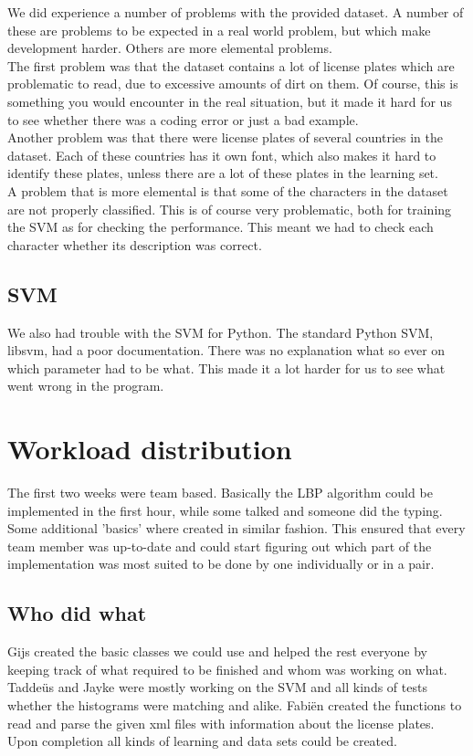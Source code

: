 \documentclass[a4paper]{article}
\begin{document}
We did experience a number of problems with the provided dataset. A number of
these are problems to be expected in a real world problem, but which make
development harder. Others are more elemental problems.\\
The first problem was that the dataset contains a lot of license plates which
are problematic to read, due to excessive amounts of dirt on them. Of course,
this is something you would encounter in the real situation, but it made it
hard for us to see whether there was a coding error or just a bad example.\\
Another problem was that there were license plates of several countries in
the dataset. Each of these countries has it own font, which also makes it
hard to identify these plates, unless there are a lot of these plates in the
learning set.\\
A problem that is more elemental is that some of the characters in the dataset
are not properly classified. This is of course very problematic, both for
training the SVM as for checking the performance. This meant we had to check
each character whether its description was correct.

\subsection*{SVM}

We also had trouble with the SVM for Python. The standard Python SVM, libsvm,
had a poor documentation. There was no explanation what so ever on which
parameter had to be what. This made it a lot harder for us to see what went
wrong in the program.

\section{Workload distribution}

The first two weeks were team based. Basically the LBP algorithm could be
implemented in the first hour, while some talked and someone did the typing.
Some additional 'basics' where created in similar fashion. This ensured that
every team member was up-to-date and could start figuring out which part of the
implementation was most suited to be done by one individually or in a pair.

\subsection{Who did what}
Gijs created the basic classes we could use and helped the rest everyone by 
keeping track of what required to be finished and whom was working on what. 
Tadde\"us and Jayke were mostly working on the SVM and all kinds of tests
whether the histograms were matching and alike. Fabi\"en created the functions
to read and parse the given xml files with information about the license
plates. Upon completion all kinds of learning and data sets could be created.
\end{document}
